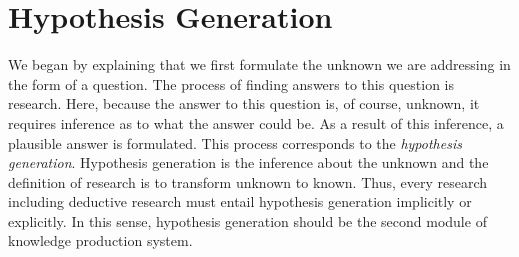 







\section{Hypothesis Generation}
We began by explaining that we first formulate the unknown we are addressing in the form of a question. The process of finding answers to this question is research. Here, because the answer to this question is, of course, unknown, it requires inference as to what the answer could be. As a result of this inference, a plausible answer is formulated. This process corresponds to the \textit{hypothesis generation}. Hypothesis generation is the inference about the unknown and the definition of research is to transform unknown to known. Thus, every research including deductive research must entail hypothesis generation implicitly or explicitly. In this sense, hypothesis generation should be the second module of knowledge production system.

